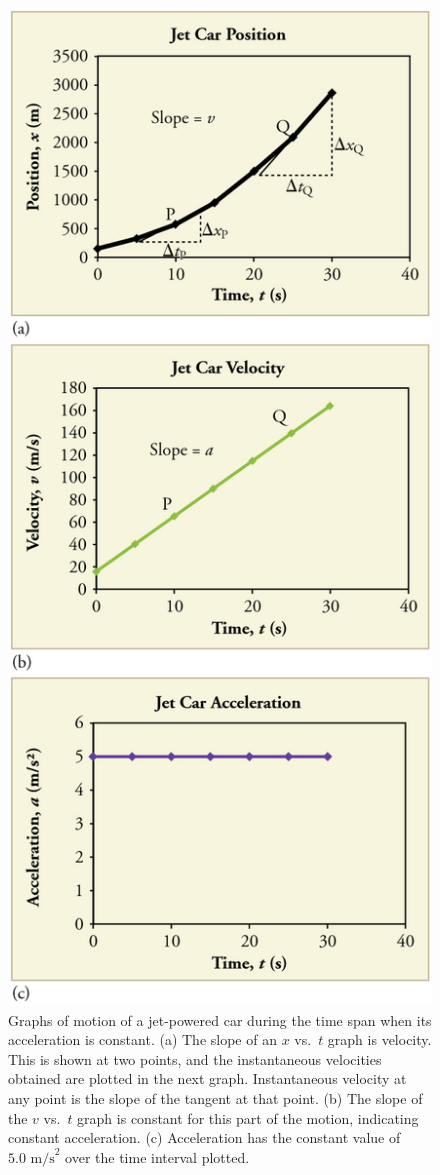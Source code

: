 \documentclass[
]{book}
\begin{document}
\begin{figure}
\hypertarget{import-auto-id3596921}{%
\centering
\includegraphics{images/Figure_02_07_03.jpg}
\caption{Graphs of motion of a jet-powered car during the time span when its
acceleration is constant. (a) The slope of an \(x{}\) vs.~\(t{}\) graph is
velocity. This is shown at two points, and the instantaneous velocities
obtained are plotted in the next graph. Instantaneous velocity at any
point is the slope of the tangent at that point. (b) The slope of the
\(v{}\) vs.~\(t{}\) graph is constant for this part of the motion,
indicating constant acceleration. (c) Acceleration has the constant
value of \({5\text{.}\text{0\ m/s}^{2}}{}\) over the time interval
plotted.}\label{import-auto-id3596921}
}
\end{figure}
\end{document}
